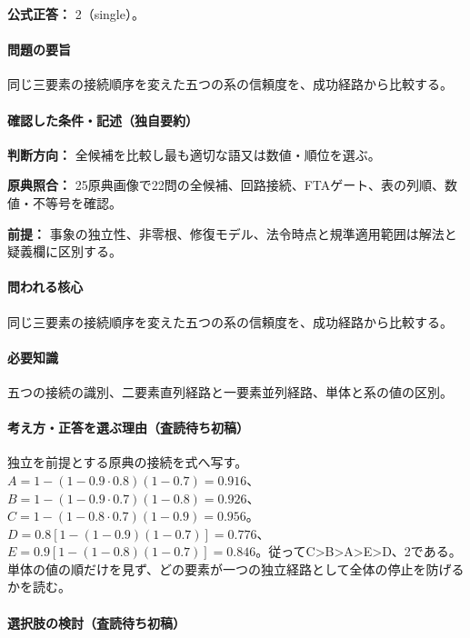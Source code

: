 \textbf{公式正答：} 2（single）。

\paragraph{問題の要旨} 同じ三要素の接続順序を変えた五つの系の信頼度を、成功経路から比較する。

\paragraph{確認した条件・記述（独自要約）}\mbox{}\par

\noindent\textbf{判断方向：} 全候補を比較し最も適切な語又は数値・順位を選ぶ。\par

\noindent\textbf{原典照合：} 25原典画像で22問の全候補、回路接続、FTAゲート、表の列順、数値・不等号を確認。\par

\noindent\textbf{前提：} 事象の独立性、非零根、修復モデル、法令時点と規準適用範囲は解法と疑義欄に区別する。\par

\paragraph{問われる核心} 同じ三要素の接続順序を変えた五つの系の信頼度を、成功経路から比較する。

\paragraph{必要知識} 五つの接続の識別、二要素直列経路と一要素並列経路、単体と系の値の区別。

\paragraph{考え方・正答を選ぶ理由（査読待ち初稿）} 独立を前提とする原典の接続を式へ写す。\(A=1-(1-0.9\cdot0.8)(1-0.7)=0.916\)、\(B=1-(1-0.9\cdot0.7)(1-0.8)=0.926\)、\(C=1-(1-0.8\cdot0.7)(1-0.9)=0.956\)。\(D=0.8[1-(1-0.9)(1-0.7)]=0.776\)、\(E=0.9[1-(1-0.8)(1-0.7)]=0.846\)。従ってC>B>A>E>D、2である。単体の値の順だけを見ず、どの要素が一つの独立経路として全体の停止を防げるかを読む。

\paragraph{選択肢の検討（査読待ち初稿）}\mbox{}\par

